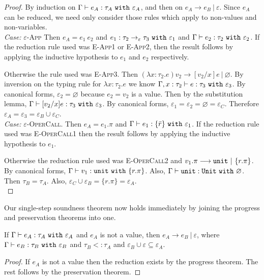 \begin{proof} By induction on $\Gamma \vdash e_A: \tau_A~\mathtt{with}~ \varepsilon_A$, and then on $e_A \longrightarrow e_B~|~\varepsilon$. Since $e_A$ can be reduced, we need only consider those rules which apply to non-values and non-variables. \\

\textit{Case:} \textsc{$\varepsilon$-App} Then $e_A = e_1 ~ e_2$ and $e_1: \tau_2 \rightarrow_{\varepsilon} \tau_3~\mathtt{with}~ \varepsilon_1$ and $\Gamma \vdash e_2: \tau_2~\mathtt{with}~ \varepsilon_2$. If the reduction rule used was \textsc{E-App1} or \textsc{E-App2}, then the result follows by applying the inductive hypothesis to $e_1$ and $e_2$ respectively.

Otherwise the rule used was \textsc{E-App3}. Then $(\lambda x: \tau_2. e) v_2 \longrightarrow [ v_2/x] e~|~\varnothing$. By inversion on the typing rule for $\lambda x:  \tau_2. e$ we know $\Gamma, x:  \tau_2 \vdash  e:  \tau_3~\mathtt{with}~ \varepsilon_3$. By canonical forms, $\varepsilon_2 = \varnothing$ because $ e_2 =  v_2$ is a value. Then by the substitution lemma, $ \Gamma \vdash [ v_2/x] e :  \tau_3~\mathtt{with}~ \varepsilon_3$. By canonical forms, $\varepsilon_1 = \varepsilon_2 = \varnothing = \varepsilon_C$. Therefore $\varepsilon_A = \varepsilon_3 = \varepsilon_B \cup \varepsilon_C$.\\

\textit{Case:} \textsc{$\varepsilon$-OperCall}. Then $e_A = e_1.\pi$ and $ \Gamma \vdash e_1 : \{ \bar r \}~\mathtt{with}~ \varepsilon_1$. If the reduction rule used was \textsc{E-OperCall1} then the result follows by applying the inductive hypothesis to $ e_1$.

Otherwise the reduction rule used was \textsc{E-OperCall2} and $v_1.\pi \longrightarrow \mathtt{unit}~|~\{ r.\pi \}$. By canonical forms, $ \Gamma \vdash v_1: \mathtt{unit}~\mathtt{with}~ \{ r.\pi \}$. Also, $ \Gamma \vdash \mathtt{unit}: \mathtt{Unit}~\mathtt{with}~ \varnothing$. Then $\tau_B = \tau_A$. Also, $\varepsilon_C \cup \varepsilon_B = \{ r.\pi \} = \varepsilon_A$.\\

\end{proof}

Our single-step soundness theorem now holds immediately by joining the progress and preservation theorems into one.

\begin{theorem}[Soundness]
If $ \Gamma \vdash  e_A:  \tau_A~\mathtt{with}~ \varepsilon_A$ and $ e_A$ is not a value, then $e_A \longrightarrow e_B~|~\varepsilon$, where $ \Gamma \vdash e_B:  \tau_B~\mathtt{with}~ \varepsilon_B$ and $ \tau_B <:  \tau_A$ and $\varepsilon_B \cup \varepsilon \subseteq \varepsilon_A$.
\end{theorem}
\begin{proof}
If $ e_A$ is not a value then the reduction exists by the progress theorem. The rest follows by the preservation theorem.
\end{proof}

